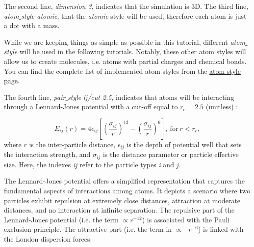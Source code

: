 \noindent The second line, \textit{dimension 3}, indicates that the simulation
is 3D. The third line, \textit{atom$\_$style atomic}, that the \textit{atomic} style
will be used, therefore each atom is just a dot with a mass.

\begin{tcolorbox}[colback=mylightblue!5!white,colframe=mylightblue!75!black,title=About the atom style]

\vspace{0.25cm} \noindent While we are keeping things as simple as possible in this tutorial,
different \textit{atom$\_$style} will be used in the following tutorials.
Notably, these other atom styles will allow us to create molecules,
i.e. atoms with partial charges and chemical bonds. You can find the complete list
of implemented atom styles from the \href{https://docs.lammps.org/atom_style.html}{atom style page}.
\end{tcolorbox}

\noindent The fourth line, \textit{pair$\_$style lj/cut 2.5}, indicates that atoms
will be interacting through a Lennard-Jones potential with
a cut-off equal to $r_c = 2.5$ (unitless)
\cite{wang2020lennard,fischer2023history}:

$$E_{ij} (r) = 4 \epsilon_{ij} \left[ \left( \dfrac{\sigma_{ij}}{r} \right)^{12} - \left( \dfrac{\sigma_{ij}}{r} \right)^{6} \right], ~ \text{for} ~ r < r_c,$$
where $r$ is the inter-particle distance,
$\epsilon_{ij}$ is the depth of potential well that sets the interaction strength, and
$\sigma_{ij}$ is the distance parameter or particle effective size.
Here, the indexes \textit{ij} refer to the particle types \textit{i} and \textit{j}.

\begin{tcolorbox}[colback=mylightblue!5!white,colframe=mylightblue!75!black,title=About Lennard-Jones potential]

\vspace{0.25cm} \noindent The Lennard-Jones potential offers a simplified representation
that captures the fundamental
aspects of interactions among atoms. It depicts a scenario where two
particles exhibit repulsion at extremely close distances, attraction at moderate
distances, and no interaction at infinite separation. The repulsive part of the 
Lennard-Jones potential (i.e. the term $\propto r^{-12}$) is associated
with the Pauli exclusion principle. The attractive part (i.e. the term
in $\propto - r^{-6}$)
is linked with the London dispersion forces.
\end{tcolorbox}

